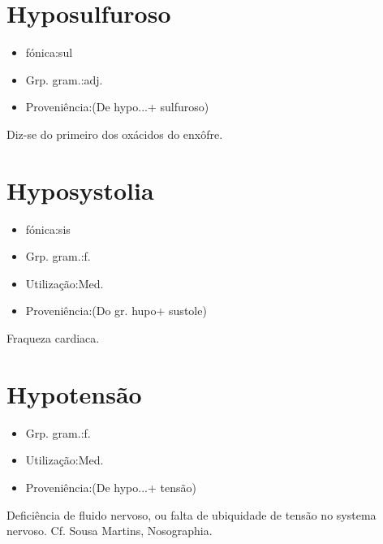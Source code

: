 \documentclass{article}
\begin{document}
\section{Hyposulfuroso}
\begin{itemize}
\item {fónica:sul}
\end{itemize}
\begin{itemize}
\item {Grp. gram.:adj.}
\end{itemize}
\begin{itemize}
\item {Proveniência:(De \textunderscore hypo...\textunderscore  + \textunderscore sulfuroso\textunderscore )}
\end{itemize}
Diz-se do primeiro dos oxácidos do enxôfre.
\section{Hyposystolia}
\begin{itemize}
\item {fónica:sis}
\end{itemize}
\begin{itemize}
\item {Grp. gram.:f.}
\end{itemize}
\begin{itemize}
\item {Utilização:Med.}
\end{itemize}
\begin{itemize}
\item {Proveniência:(Do gr. \textunderscore hupo\textunderscore  + \textunderscore sustole\textunderscore )}
\end{itemize}
Fraqueza cardiaca.
\section{Hypotensão}
\begin{itemize}
\item {Grp. gram.:f.}
\end{itemize}
\begin{itemize}
\item {Utilização:Med.}
\end{itemize}
\begin{itemize}
\item {Proveniência:(De \textunderscore hypo...\textunderscore  + \textunderscore tensão\textunderscore )}
\end{itemize}
Deficiência de fluido nervoso, ou falta de ubiquidade de tensão no systema nervoso. Cf. Sousa Martins, \textunderscore Nosographia\textunderscore .
\end{document}
